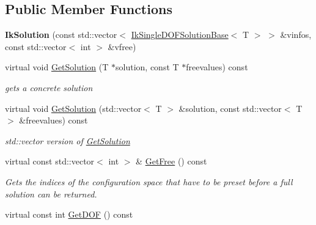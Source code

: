 \subsection*{Public Member Functions}
\begin{DoxyCompactItemize}
\item 
\hypertarget{classikfast_1_1IkSolution_a6b76af506a24ba4b78b1c9d3dc110a72}{{\bfseries Ik\-Solution} (const std\-::vector$<$ \hyperlink{classikfast_1_1IkSingleDOFSolutionBase}{Ik\-Single\-D\-O\-F\-Solution\-Base}$<$ T $>$ $>$ \&vinfos, const std\-::vector$<$ int $>$ \&vfree)}\label{classikfast_1_1IkSolution_a6b76af506a24ba4b78b1c9d3dc110a72}

\item 
virtual void \hyperlink{classikfast_1_1IkSolution_a197868105dffb498bec69c38318283a2}{Get\-Solution} (T $\ast$solution, const T $\ast$freevalues) const 
\begin{DoxyCompactList}\small\item\em gets a concrete solution \end{DoxyCompactList}\item 
\hypertarget{classikfast_1_1IkSolution_a56a7305f2111808478f85a43ecc5e6aa}{virtual void \hyperlink{classikfast_1_1IkSolution_a56a7305f2111808478f85a43ecc5e6aa}{Get\-Solution} (std\-::vector$<$ T $>$ \&solution, const std\-::vector$<$ T $>$ \&freevalues) const }\label{classikfast_1_1IkSolution_a56a7305f2111808478f85a43ecc5e6aa}

\begin{DoxyCompactList}\small\item\em std\-::vector version of \hyperlink{classikfast_1_1IkSolution_a197868105dffb498bec69c38318283a2}{Get\-Solution} \end{DoxyCompactList}\item 
virtual const std\-::vector$<$ int $>$ \& \hyperlink{classikfast_1_1IkSolution_a31267c02ff31436b0bfe3672bcecce5e}{Get\-Free} () const 
\begin{DoxyCompactList}\small\item\em Gets the indices of the configuration space that have to be preset before a full solution can be returned. \end{DoxyCompactList}\item 
\hypertarget{classikfast_1_1IkSolution_a8d46fe7ed5a582f9ad3f4bfc86b41297}{virtual const int \hyperlink{classikfast_1_1IkSolution_a8d46fe7ed5a582f9ad3f4bfc86b41297}{Get\-D\-O\-F} () const }\label{classikfast_1_1IkSolution_a8d46fe7ed5a582f9ad3f4bfc86b41297}


\end{DoxyCompactItemize}
